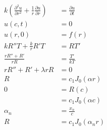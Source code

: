 \documentclass{article}
\begin{document}
\setcounter{subsubsection}{8}
\subsubsection{}

\begin{align*}
  k \left( \frac{\partial^2 u}{\partial r^2} + \frac{1}{r} \frac{\partial u}{\partial r} \right) & = \frac{\partial u}{\partial t}                                         \\
  u(c, t)                                                                                        & = 0                                                                     \\
  u(r, 0)                                                                                        & = f(r)                                                                  \\
  k R'' T + \frac{k}{r} R' T                                                                     & = R T'                                                                  \\
  \frac{r R'' + R'}{r R}                                                                         & = \frac{T'}{k T}                                                        \\
  r R'' + R' + \lambda r R                                                                       & = 0                                                                     \\
  R                                                                                              & = c_1 J_0(\alpha r)                                                     \\
  0                                                                                              & = R(c)                                                                  \\
                                                                                                 & = c_1 J_0(\alpha c)                                                     \\
  \alpha_n                                                                                       & = \frac{x_n}{c}                                                         \\
  R                                                                                              & = c_1 J_0(\alpha_n r)                                                   \\

\end{align*}
\end{document}
